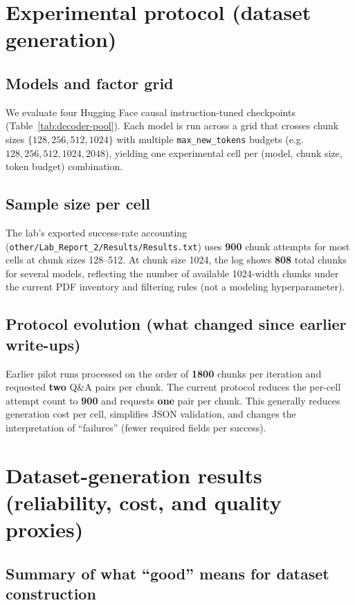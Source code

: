 \documentclass[11pt]{article}
\begin{document}
\section{Experimental protocol (dataset generation)}
\label{sec:protocol}

\subsection{Models and factor grid}

We evaluate four Hugging Face causal instruction-tuned checkpoints (Table~\ref{tab:decoder-pool}). Each model is run across a grid that crosses chunk sizes $\{128,256,512,1024\}$ with multiple \texttt{max\_new\_tokens} budgets (e.g.\ $128,256,512,1024,2048$), yielding one experimental cell per (model, chunk size, token budget) combination.

\subsection{Sample size per cell}

The lab's exported success-rate accounting (\texttt{other/Lab\_Report\_2/Results/Results.txt}) uses \textbf{900} chunk attempts for most cells at chunk sizes 128--512. At chunk size 1024, the log shows \textbf{808} total chunks for several models, reflecting the number of available 1024-width chunks under the current PDF inventory and filtering rules (not a modeling hyperparameter).

\subsection{Protocol evolution (what changed since earlier write-ups)}

Earlier pilot runs processed on the order of \textbf{1800} chunks per iteration and requested \textbf{two} Q\&A pairs per chunk. The current protocol reduces the per-cell attempt count to \textbf{900} and requests \textbf{one} pair per chunk. This generally reduces generation cost per cell, simplifies JSON validation, and changes the interpretation of ``failures'' (fewer required fields per success).

\section{Dataset-generation results (reliability, cost, and quality proxies)}
\label{sec:lab-results}

\subsection{Summary of what ``good'' means for dataset construction}
\end{document}

